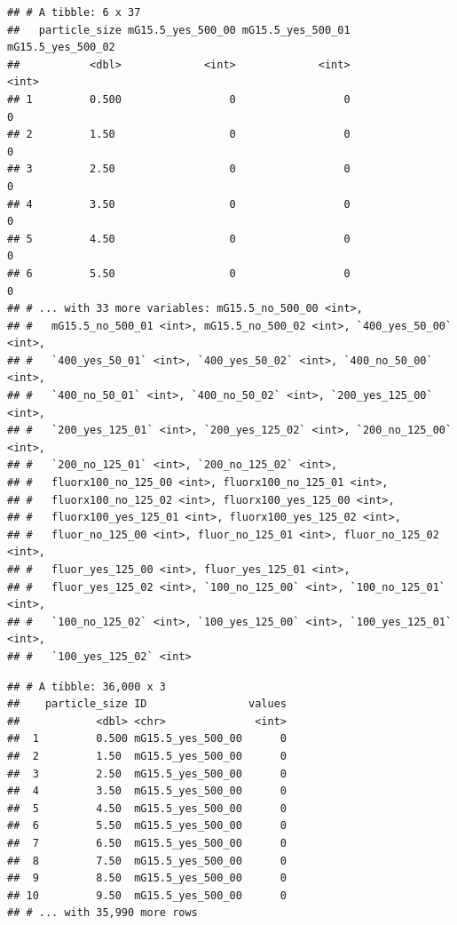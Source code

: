 \documentclass[10pt,letterpaper]{article}
\newenvironment{Shaded}{\begin{snugshade}}{\end{snugshade}}
\newcommand{\KeywordTok}[1]{\textcolor[rgb]{0.13,0.29,0.53}{\textbf{#1}}}
\newcommand{\DecValTok}[1]{\textcolor[rgb]{0.00,0.00,0.81}{#1}}
\newcommand{\StringTok}[1]{\textcolor[rgb]{0.31,0.60,0.02}{#1}}
\newcommand{\OperatorTok}[1]{\textcolor[rgb]{0.81,0.36,0.00}{\textbf{#1}}}
\newcommand{\NormalTok}[1]{#1}
\begin{document}
\begin{verbatim}
## # A tibble: 6 x 37
##   particle_size mG15.5_yes_500_00 mG15.5_yes_500_01 mG15.5_yes_500_02
##           <dbl>             <int>             <int>             <int>
## 1         0.500                 0                 0                 0
## 2         1.50                  0                 0                 0
## 3         2.50                  0                 0                 0
## 4         3.50                  0                 0                 0
## 5         4.50                  0                 0                 0
## 6         5.50                  0                 0                 0
## # ... with 33 more variables: mG15.5_no_500_00 <int>,
## #   mG15.5_no_500_01 <int>, mG15.5_no_500_02 <int>, `400_yes_50_00` <int>,
## #   `400_yes_50_01` <int>, `400_yes_50_02` <int>, `400_no_50_00` <int>,
## #   `400_no_50_01` <int>, `400_no_50_02` <int>, `200_yes_125_00` <int>,
## #   `200_yes_125_01` <int>, `200_yes_125_02` <int>, `200_no_125_00` <int>,
## #   `200_no_125_01` <int>, `200_no_125_02` <int>,
## #   fluorx100_no_125_00 <int>, fluorx100_no_125_01 <int>,
## #   fluorx100_no_125_02 <int>, fluorx100_yes_125_00 <int>,
## #   fluorx100_yes_125_01 <int>, fluorx100_yes_125_02 <int>,
## #   fluor_no_125_00 <int>, fluor_no_125_01 <int>, fluor_no_125_02 <int>,
## #   fluor_yes_125_00 <int>, fluor_yes_125_01 <int>,
## #   fluor_yes_125_02 <int>, `100_no_125_00` <int>, `100_no_125_01` <int>,
## #   `100_no_125_02` <int>, `100_yes_125_00` <int>, `100_yes_125_01` <int>,
## #   `100_yes_125_02` <int>
\end{verbatim}

\begin{Shaded}
\end{Shaded}

\begin{verbatim}
## # A tibble: 36,000 x 3
##    particle_size ID                values
##            <dbl> <chr>              <int>
##  1         0.500 mG15.5_yes_500_00      0
##  2         1.50  mG15.5_yes_500_00      0
##  3         2.50  mG15.5_yes_500_00      0
##  4         3.50  mG15.5_yes_500_00      0
##  5         4.50  mG15.5_yes_500_00      0
##  6         5.50  mG15.5_yes_500_00      0
##  7         6.50  mG15.5_yes_500_00      0
##  8         7.50  mG15.5_yes_500_00      0
##  9         8.50  mG15.5_yes_500_00      0
## 10         9.50  mG15.5_yes_500_00      0
## # ... with 35,990 more rows
\end{verbatim}
\end{document}
